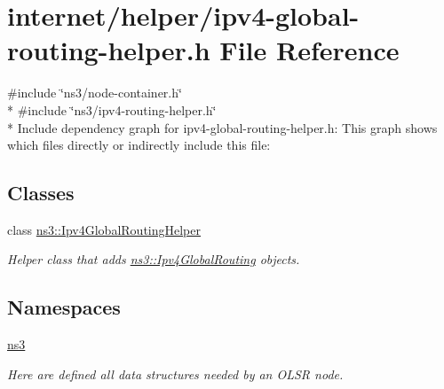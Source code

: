 \hypertarget{ipv4-global-routing-helper_8h}{}\section{internet/helper/ipv4-\/global-\/routing-\/helper.h File Reference}
\label{ipv4-global-routing-helper_8h}
{\ttfamily \#include \char`\"{}ns3/node-\/container.\+h\char`\"{}}\\*
{\ttfamily \#include \char`\"{}ns3/ipv4-\/routing-\/helper.\+h\char`\"{}}\\*
Include dependency graph for ipv4-\/global-\/routing-\/helper.h\+:
This graph shows which files directly or indirectly include this file\+:
\subsection*{Classes}
\begin{DoxyCompactItemize}
\item 
class \hyperlink{classns3_1_1Ipv4GlobalRoutingHelper}{ns3\+::\+Ipv4\+Global\+Routing\+Helper}
\begin{DoxyCompactList}\small\item\em Helper class that adds \hyperlink{classns3_1_1Ipv4GlobalRouting}{ns3\+::\+Ipv4\+Global\+Routing} objects. \end{DoxyCompactList}\end{DoxyCompactItemize}
\subsection*{Namespaces}
\begin{DoxyCompactItemize}
\item 
 \hyperlink{namespacens3}{ns3}
\begin{DoxyCompactList}\small\item\em Here are defined all data structures needed by an O\+L\+SR node. \end{DoxyCompactList}\end{DoxyCompactItemize}
